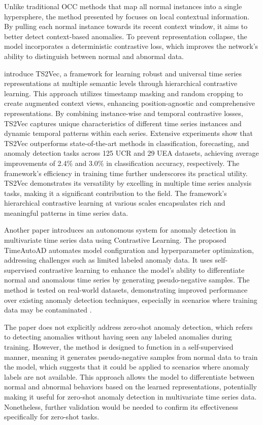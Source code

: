 Unlike traditional OCC methods that map all normal instances into a single hypersphere, the method presented by \cite{chen_time-series_2023} focuses on local contextual information. By pulling each normal instance towards its recent context window, it aims to better detect context-based anomalies. To prevent representation collapse, the model incorporates a deterministic contrastive loss, which improves the network's ability to distinguish between normal and abnormal data.

\cite{yue_ts2vec_2022} introduce TS2Vec, a framework for learning robust and universal time series representations at multiple semantic levels through hierarchical contrastive learning. This approach utilizes timestamp masking and random cropping to create augmented context views, enhancing position-agnostic and comprehensive representations. By combining instance-wise and temporal contrastive losses, TS2Vec captures unique characteristics of different time series instances and dynamic temporal patterns within each series. Extensive experiments show that TS2Vec outperforms state-of-the-art methods in classification, forecasting, and anomaly detection tasks across 125 UCR and 29 UEA datasets, achieving average improvements of 2.4\% and 3.0\% in classification accuracy, respectively. The framework's efficiency in training time further underscores its practical utility. TS2Vec demonstrates its versatility by excelling in multiple time series analysis tasks, making it a significant contribution to the field. The framework's hierarchical contrastive learning at various scales encapsulates rich and meaningful patterns in time series data.

Another paper introduces an autonomous system for anomaly detection in multivariate time series data using Contrastive Learning. The proposed TimeAutoAD automates model configuration and hyperparameter optimization, addressing challenges such as limited labeled anomaly data. It uses self-supervised contrastive learning to enhance the model's ability to differentiate normal and anomalous time series by generating pseudo-negative samples. The method is tested on real-world datasets, demonstrating improved performance over existing anomaly detection techniques, especially in scenarios where training data may be contaminated \cite{jiao_timeautoad_2022}.

The paper does not explicitly address zero-shot anomaly detection, which refers to detecting anomalies without having seen any labeled anomalies during training. However, the method is designed to function in a self-supervised manner, meaning it generates pseudo-negative samples from normal data to train the model, which suggests that it could be applied to scenarios where anomaly labels are not available. This approach allows the model to differentiate between normal and abnormal behaviors based on the learned representations, potentially making it useful for zero-shot anomaly detection in multivariate time series data. Nonetheless, further validation would be needed to confirm its effectiveness specifically for zero-shot tasks.

